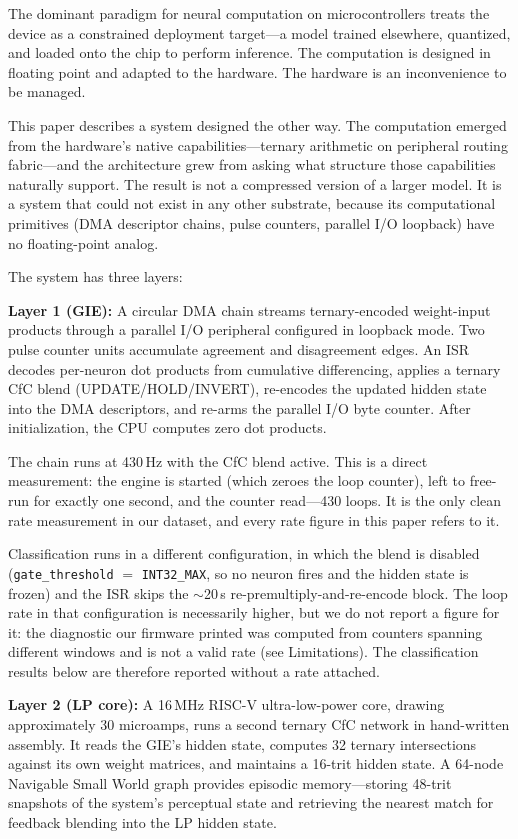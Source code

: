 \documentclass[11pt,letterpaper]{article}
\begin{document}
The dominant paradigm for neural computation on microcontrollers treats the device as a constrained deployment target---a model trained elsewhere, quantized, and loaded onto the chip to perform inference. The computation is designed in floating point and adapted to the hardware. The hardware is an inconvenience to be managed.

This paper describes a system designed the other way. The computation emerged from the hardware's native capabilities---ternary arithmetic on peripheral routing fabric---and the architecture grew from asking what structure those capabilities naturally support. The result is not a compressed version of a larger model. It is a system that could not exist in any other substrate, because its computational primitives (DMA descriptor chains, pulse counters, parallel I/O loopback) have no floating-point analog.

The system has three layers:

\textbf{Layer 1 (GIE):} A circular DMA chain streams ternary-encoded weight-input products through a parallel I/O peripheral configured in loopback mode. Two pulse counter units accumulate agreement and disagreement edges. An ISR decodes per-neuron dot products from cumulative differencing, applies a ternary CfC blend (UPDATE/HOLD/INVERT), re-encodes the updated hidden state into the DMA descriptors, and re-arms the parallel I/O byte counter. After initialization, the CPU computes zero dot products.

The chain runs at 430\,Hz with the CfC blend active. This is a direct measurement: the engine is started (which zeroes the loop counter), left to free-run for exactly one second, and the counter read---430 loops. It is the only clean rate measurement in our dataset, and every rate figure in this paper refers to it.

Classification runs in a different configuration, in which the blend is disabled (\texttt{gate\_threshold} $=$ \texttt{INT32\_MAX}, so no neuron fires and the hidden state is frozen) and the ISR skips the $\sim$20\,\textmu s re-premultiply-and-re-encode block. The loop rate in that configuration is necessarily higher, but we do not report a figure for it: the diagnostic our firmware printed was computed from counters spanning different windows and is not a valid rate (see Limitations). The classification results below are therefore reported without a rate attached.

\textbf{Layer 2 (LP core):} A 16\,MHz RISC-V ultra-low-power core, drawing approximately 30 microamps, runs a second ternary CfC network in hand-written assembly. It reads the GIE's hidden state, computes 32 ternary intersections against its own weight matrices, and maintains a 16-trit hidden state. A 64-node Navigable Small World graph provides episodic memory---storing 48-trit snapshots of the system's perceptual state and retrieving the nearest match for feedback blending into the LP hidden state.
\end{document}
